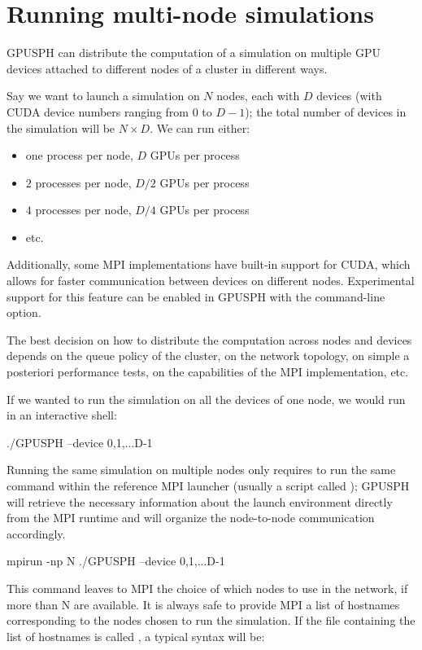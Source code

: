 \documentclass{../GPUSPHtemplate}
\begin{document}
\section{Running multi-node simulations}

GPUSPH can distribute the computation of a simulation on multiple 
GPU devices attached to different nodes of a cluster in different ways.

Say we want to launch a simulation on $N$ nodes, each with $D$ devices 
(with CUDA device numbers ranging from $0$ to $D-1$); 
the total number of devices in the simulation will be $N \times D$. We can run either:
\begin{itemize}
\item one process per node, $D$ GPUs per process
\item $2$ processes per node, $D/2$ GPUs per process
\item $4$ processes per node, $D/4$ GPUs per process
\item etc.
\end{itemize}

Additionally, some MPI implementations have built-in support for CUDA, 
which allows for faster communication between devices on different nodes. 
Experimental support for this feature can be enabled in GPUSPH with the  command-line option.

The best decision on how to distribute the computation across nodes and devices depends on 
the queue policy of the cluster, on the network topology, on simple a posteriori performance tests, 
on the capabilities of the MPI implementation, etc.

If we wanted to run the simulation on all the devices of one node, we would run in an interactive shell:

\begin{shellcode}
./GPUSPH --device 0,1,...D-1
\end{shellcode}

Running the same simulation on multiple nodes only requires to run 
the same command within the reference MPI launcher (usually a script called ); 
GPUSPH will retrieve the necessary information about the launch environment 
directly from the MPI runtime and will organize the node-to-node communication accordingly.

\begin{shellcode}
mpirun -np N ./GPUSPH --device 0,1,...D-1
\end{shellcode}

This command leaves to MPI the choice of which nodes to use in the network, 
if more than N are available. 
It is always safe to provide MPI a list of hostnames corresponding 
to the nodes chosen to run the simulation. 
If the file containing the list of hostnames is called , a typical syntax will be:
\end{document}
